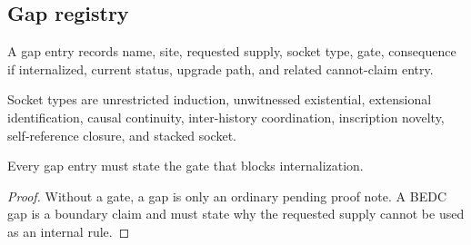 \subsection{Gap registry}
\label{subsec:philosophy-gap-registry-table}

\begin{definition}
\label{def:philosophy-gap-registry-entry}
A gap entry records name, site, requested supply, socket type, gate,
consequence if internalized, current status, upgrade path, and related
cannot-claim entry.
\end{definition}

\begin{definition}
\label{def:philosophy-socket-type-registry}
Socket types are unrestricted induction, unwitnessed existential,
extensional identification, causal continuity, inter-history
coordination, inscription novelty, self-reference closure, and stacked
socket.
\end{definition}

\begin{theorem}
\label{thm:philosophy-gap-entries-require-gates}
Every gap entry must state the gate that blocks internalization.
\end{theorem}
\begin{proof}
Without a gate, a gap is only an ordinary pending proof note. A BEDC gap
is a boundary claim and must state why the requested supply cannot be
used as an internal rule.
\end{proof}

